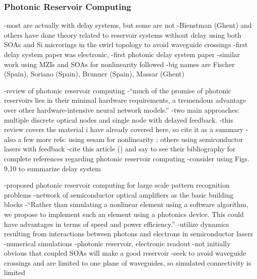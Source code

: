 \subsubsection{Photonic Reservoir Computing}
-most are actually with delay systems, but some are not
-Bienstman (Ghent) and others have done theory related to reservoir systems without delay using both SOAs and Si microrings in the swirl topology to avoid waveguide crossings
-first delay system paper was electronic, \cite{apso2011}
-first photonic delay system paper \cite{laso2012}
-similar work using MZIs and SOAs for nonlinearity followed
-big names are Fischer (Spain), Soriano (Spain), Brunner (Spain), Massar (Ghent)


\cite{vabr2017}
-review of photonic reservoir computing
-``much of the promise of photonic reservoirs lies in their minimal hardware requirements, a tremendous advantage over other hardware-intensive neural network models.''
-two main approaches: multiple discrete optical nodes and single node with delayed feedback.
-this review covers the material i have already covered here, so cite it as a summary
-also a few more refs: using sesam for nonlinearity \cite{dedu2014}; others using semiconductor lasers with feedback \cite{ngve2014}
-cite this article (\cite{vabr2017}) and say to see their bibliography for complete references regarding photonic reservoir computing
-consider using Figs. 9,10 to summarize delay system

\vspace{3em}

\cite{vadi2008}
-proposed photonic reservoir computing for large scale pattern recognition problems
-network of semiconductor optical amplifiers as the basic building blocks
-``Rather than simulating a nonlinear element using a software algorithm, we propose to implement such an element using a photonics device. This could have advantages in terms of speed and power efficiency.''
-utilize dynamics resulting from interactions between photons and electrons in semiconductor lasers
-numerical simulations
-photonic reservoir, electronic readout
-not initially obvious that coupled SOAs will make a good reservoir
-seek to avoid waveguide crossings and are limited to one plane of waveguides, so simulated connectivity is limited

